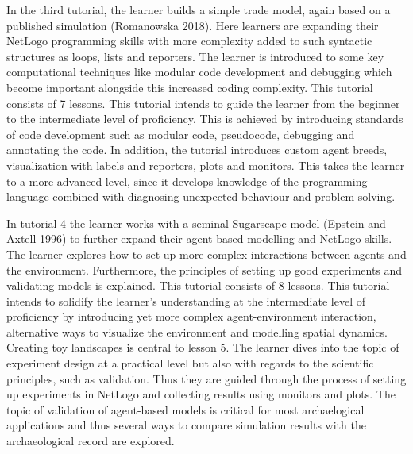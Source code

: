 \documentclass[
]{article}
\begin{document}
In the third tutorial, the learner builds a simple trade model, again based on a published simulation (Romanowska 2018). Here learners are expanding their NetLogo programming skills with more complexity added to such syntactic structures as loops, lists and reporters. The learner is introduced to some key computational techniques like modular code development and debugging which become important alongside this increased coding complexity. This tutorial consists of 7 lessons. This tutorial intends to guide the learner from the beginner to the intermediate level of proficiency. This is achieved by introducing standards of code development such as modular code, pseudocode, debugging and annotating the code. In addition, the tutorial introduces custom agent breeds, visualization with labels and reporters, plots and monitors. This takes the learner to a more advanced level, since it develops knowledge of the programming language combined with diagnosing unexpected behaviour and problem solving.

In tutorial 4 the learner works with a seminal Sugarscape model (Epstein and Axtell 1996) to further expand their agent-based modelling and NetLogo skills. The learner explores how to set up more complex interactions between agents and the environment. Furthermore, the principles of setting up good experiments and validating models is explained. This tutorial consists of 8 lessons. This tutorial intends to solidify the learner's understanding at the intermediate level of proficiency by introducing yet more complex agent-environment interaction, alternative ways to visualize the environment and modelling spatial dynamics. Creating toy landscapes is central to lesson 5. The learner dives into the topic of experiment design at a practical level but also with regards to the scientific principles, such as validation. Thus they are guided through the process of setting up experiments in NetLogo and collecting results using monitors and plots. The topic of validation of agent-based models is critical for most archaelogical applications and thus several ways to compare simulation results with the archaeological record are explored.
\end{document}
